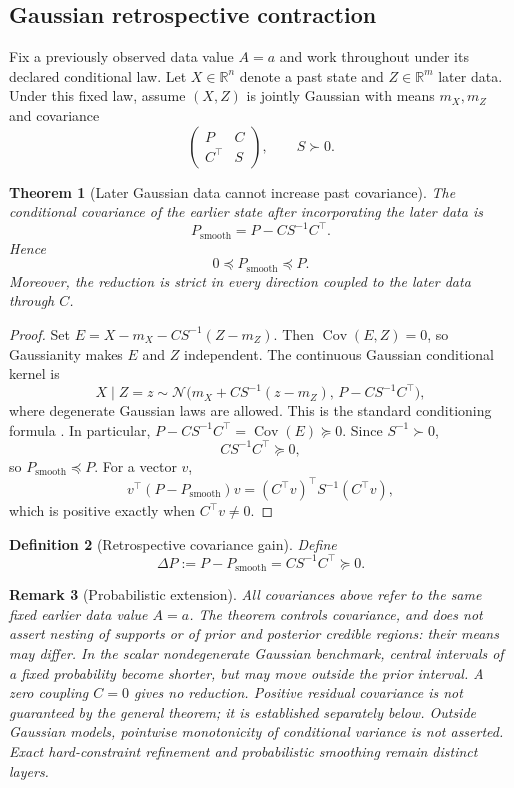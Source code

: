 \documentclass[11pt]{article}
\newtheorem{definition}{Definition}[section]
\newtheorem{theorem}[definition]{Theorem}
\newtheorem{remark}[definition]{Remark}
\begin{document}
\subsection{Gaussian retrospective contraction}

Fix a previously observed data value $A=a$ and work throughout
under its declared conditional law. Let $X\in\mathbb R^n$ denote a
past state and $Z\in\mathbb R^m$ later data. Under this fixed law,
assume $(X,Z)$ is jointly Gaussian with means $m_X,m_Z$ and covariance
\[
\begin{pmatrix}
P & C\\
C^\top & S
\end{pmatrix},
\qquad
S\succ0.
\]

\begin{theorem}[Later Gaussian data cannot increase past covariance]
\label{thm:gaussian-contraction}
The conditional covariance of the earlier state after incorporating the later data is
\[
P_{\mathrm{smooth}}
=
P-CS^{-1}C^\top.
\]
Hence
\[
0\preceq P_{\mathrm{smooth}}\preceq P.
\]
Moreover, the reduction is strict in every direction coupled to the later data through \(C\).
\end{theorem}

\begin{proof}
Set $E=X-m_X-CS^{-1}(Z-m_Z)$. Then
$\operatorname{Cov}(E,Z)=0$, so Gaussianity makes $E$ and $Z$
independent. The continuous Gaussian conditional kernel is
\[
X\mid Z=z\sim\mathcal N
\bigl(m_X+CS^{-1}(z-m_Z),\,P-CS^{-1}C^\top\bigr),
\]
where degenerate Gaussian laws are allowed. This is the standard
conditioning formula \cite[Appendix A.1, Lemma A.3]{SarkkaSvensson2023}.
In particular,
$P-CS^{-1}C^\top=\operatorname{Cov}(E)\succeq0$.
Since \(S^{-1}\succ0\),
\[
CS^{-1}C^\top\succeq0,
\]
so \(P_{\mathrm{smooth}}\preceq P\). For a vector \(v\),
\[
v^\top(P-P_{\mathrm{smooth}})v
=
(C^\top v)^\top S^{-1}(C^\top v),
\]
which is positive exactly when \(C^\top v\neq0\).
\end{proof}

\begin{definition}[Retrospective covariance gain]
Define
\[
\Delta P:=P-P_{\mathrm{smooth}}=CS^{-1}C^\top\succeq0.
\]
\end{definition}

\begin{remark}[Probabilistic extension]
All covariances above refer to the same fixed earlier data value
$A=a$. The theorem controls covariance, and does not assert nesting
of supports or of prior and posterior credible regions: their means
may differ. In the scalar nondegenerate Gaussian benchmark, central
intervals of a fixed probability become shorter, but may move outside
the prior interval. A zero coupling $C=0$ gives no reduction.
Positive residual covariance is not guaranteed by the general theorem;
it is established separately below. Outside Gaussian models,
pointwise monotonicity of conditional variance is not asserted.
Exact hard-constraint refinement and probabilistic smoothing remain
distinct layers.
\end{remark}
\end{document}
